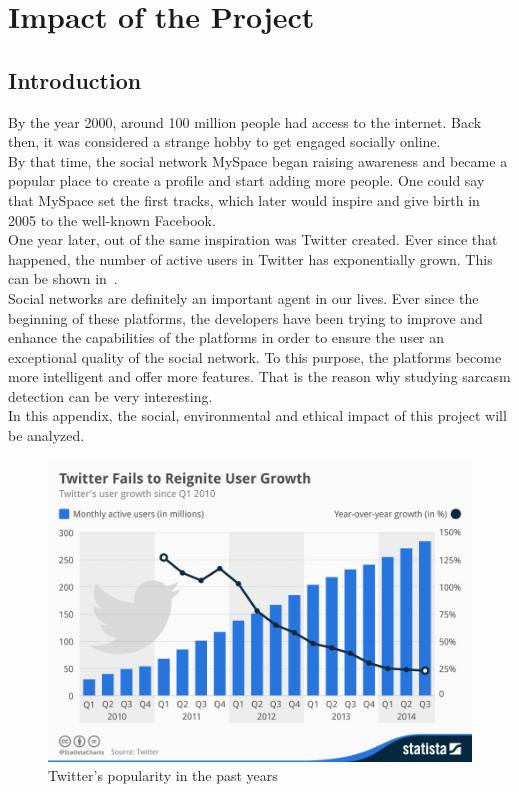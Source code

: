 \chapter{Impact of the Project}
\section{Introduction}
By the year 2000, around 100 million people had access to the internet. Back then, it was considered a strange hobby to get engaged socially online.\\
By that time, the social network MySpace began raising awareness and became a popular place to create a profile and start adding more people. One could say that MySpace set the first tracks, which later would inspire and give birth in 2005 to the well-known Facebook.\\
One year later, out of the same inspiration was Twitter created. Ever since that happened, the number of active users in Twitter has exponentially grown. This can be shown in~.\\
Social networks are definitely an important agent in our lives. Ever since the beginning of these platforms, the developers have been trying to improve and enhance the capabilities of the platforms in order to ensure the user an exceptional quality of the social network. To this purpose, the platforms become more intelligent and offer more features. That is the reason why studying sarcasm detection can be very interesting.\\
In this appendix, the social, environmental and ethical impact of this project will be analyzed.
\begin{figure}
    \centering
    \includegraphics[scale=0.45]{img/twitter-chart.png}
    \caption{Twitter's popularity in the past years}
    \label{fig:twitterchart}
\end{figure}
